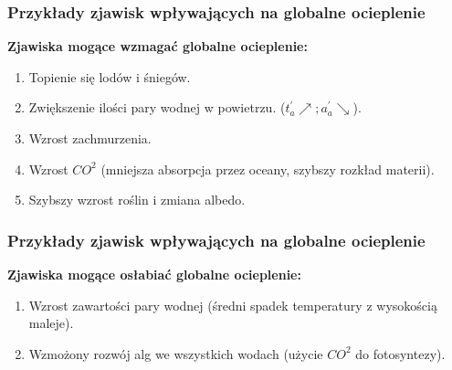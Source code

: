 \documentclass{beamer}
\begin{document}
\begin{frame}
	\frametitle{Przykłady zjawisk wpływających na globalne ocieplenie}

	\textbf{Zjawiska mogące wzmagać globalne ocieplenie:}
	\begin{enumerate}
		\item Topienie się lodów i śniegów.
		
		\item Zwiększenie ilości pary wodnej w powietrzu. 
		($t_a^{'}\nearrow; a_a^{'}\searrow$).
		
		\item Wzrost zachmurzenia.
		
		\item Wzrost $CO^2$ (mniejsza absorpcja przez oceany,
		szybszy rozkład materii).
		
		\item Szybszy wzrost roślin i zmiana albedo.

	\end{enumerate}

\end{frame}


\begin{frame}
	\frametitle{Przykłady zjawisk wpływających na globalne ocieplenie}
	
	\textbf{Zjawiska mogące osłabiać globalne ocieplenie:}
	
	\begin{enumerate}
		
		\item Wzrost zawartości pary wodnej (średni spadek temperatury
		z wysokością maleje).
		
		\item Wzmożony rozwój alg we wszystkich wodach (użycie $CO^2$ 
		do fotosyntezy).
		
	\end{enumerate}
	
\end{frame}
\end{document}
